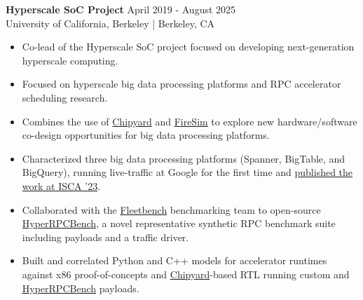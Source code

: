 \documentclass[line]{res}
\begin{document}
\begin{resume}
\label{sec:hyperscale-soc}
\textbf{Hyperscale SoC Project} \hfill April 2019 - August 2025
\\
University of California, Berkeley | Berkeley, CA
\\
\vspace{-3mm}
\begin{itemize}
\item Co-lead of the Hyperscale SoC project focused on developing next-generation hyperscale computing.
\item Focused on hyperscale big data processing platforms and RPC accelerator scheduling research.
\item Combines the use of \hyperref[sec:chipyard]{Chipyard} and \hyperref[sec:firesim]{FireSim} to explore new hardware/software co-design opportunities for big data processing platforms.
\item Characterized three big data processing platforms (Spanner, BigTable, and BigQuery), running live-traffic at Google for the first time and \hyperref[sec:iscapaper]{published the work at ISCA '23}.
\item Collaborated with the \href{https://github.com/google/fleetbench}{Fleetbench} benchmarking team to open-source \href{https://github.com/google/fleetbench/tree/cd20746b68b307b148a761c676d6400f2541082d/fleetbench/rpc}{HyperRPCBench}, a novel representative synthetic RPC benchmark suite including payloads and a traffic driver.
\item Built and correlated Python and C++ models for accelerator runtimes against x86 proof-of-concepts and \hyperref[sec:chipyard]{Chipyard}-based RTL running custom and \href{https://github.com/google/fleetbench/tree/cd20746b68b307b148a761c676d6400f2541082d/fleetbench/rpc}{HyperRPCBench} payloads.
\end{itemize}

\vspace{-2mm}


\end{resume}
\end{document}
